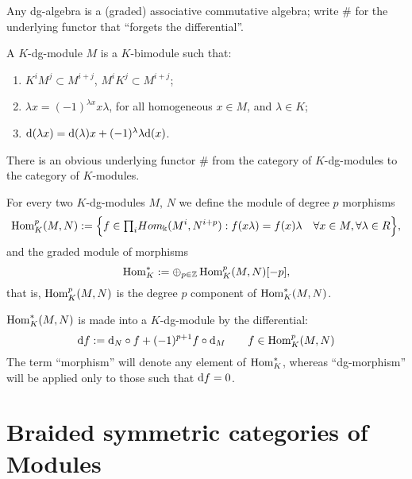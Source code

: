 Any dg-algebra is a (graded) associative commutative algebra; write
$\#$ for the underlying functor that ``forgets the differential''.

\begin{definition}
  A $K$-dg-module $M$ is a $K$-bimodule such that:
  \begin{enumerate}
  \item $K^i M^j \subset M^{i+j}$, $M^i K^j \subset M^{i+j}$;
  \item $\lambda x = (-1)^{\lambda x} x\lambda$, for all homogeneous
    $x\in M$, and $\lambda\in K$;
  \item $\mathrm{d}(\lambda x) = \mathrm{d}(\lambda)x + (-1)^\lambda \lambda\mathrm{d}(x)$.
  \end{enumerate}
\end{definition}

There is an obvious underlying functor $\#$ from the category of
$K$-dg-modules to the category of $K$-modules.

\begin{definition}
  For every two $K$-dg-modules $M$, $N$ we define the module of
  degree $p$ morphisms
  \begin{equation*}
    \operatorname{Hom}_K^p (M,N) := \Bigl\{ f\in  {\textstyle \prod_i} Hom_\Bbbk (M^i, N^{i+p}) :
      f(x\lambda) = f(x)\lambda \quad \forall x\in M, \forall \lambda
      \in R \Bigr\},
  \end{equation*}
  and the graded module of morphisms
  \begin{equation*}
    \operatorname{Hom}_K^* := \oplus_{p\in\mathbb{Z}} \operatorname{Hom}_K^p (M,N)[-p],
  \end{equation*}
  that is, $\operatorname{Hom}_K^p(M,N)$ is the degree $p$ component of
  $\operatorname{Hom}_K^*(M,N)$.
\end{definition}

$\operatorname{Hom}_K^*(M,N)$ is made into a $K$-dg-module by the differential:
\begin{equation*}
  \mathrm{d} f := \mathrm{d}_N \circ f + (-1)^{p+1} f\circ \mathrm{d}_M \qquad f\in \operatorname{Hom}_K^p(M,N)
\end{equation*}
The term ``morphism'' will denote any element of $\operatorname{Hom}_K^*$, whereas
``dg-morphism'' will be applied only to those such that $\mathrm{d} f = 0$.


\section{Braided symmetric categories of Modules}
\label{sec:btc+dg}

